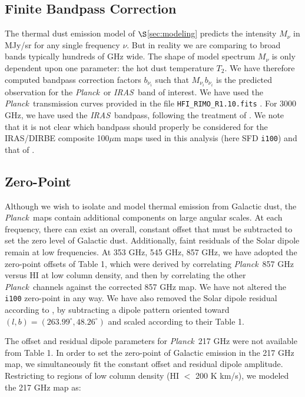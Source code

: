 \documentclass{emulateapj}
\newcommand{\IRAS}{{\it IRAS}}
\newcommand{\PLANCK}{{\it Planck}}
\begin{document}
\subsection{Finite Bandpass Correction}
The thermal dust emission model of $\S$\ref{sec:modeling} predicts the 
intensity $M_{\nu}$ in MJy/sr for any single frequency $\nu$. But in reality
we are comparing to broad bands typically hundreds of GHz wide. The shape of 
model spectrum $M_{\nu}$ is only dependent upon one parameter: the hot
dust temperature $T_2$. We have therefore computed bandpass correction factors
$b_{\nu_i}$ such that $M_{\nu_i}b_{\nu_i}$ is the predicted observation for the
\PLANCK~or \IRAS~band of interest. We have used the \PLANCK~transmission 
curves provided in the file \verb|HFI_RIMO_R1.10.fits| \citep{planckresponse}. 
For 3000 GHz, we have used the \IRAS~bandpass, following the treatment of
\cite{planckdust}. We note that it is not clear which bandpass should
properly be considered for the IRAS/DIRBE composite 100$\mu$m maps used in 
this analysis (here SFD \verb|i100|) and that of \cite{planckdust}.


\subsection{Zero-Point}
\label{sec:zp}
Although we wish to isolate and model thermal emission from Galactic dust, the
\PLANCK~maps contain additional components on large angular scales. At each 
frequency, there can exist an overall, constant offset that must be subtracted 
to set the zero level of Galactic dust. Additionally, faint residuals of the 
Solar dipole remain at low frequencies. At 353 GHz, 545 GHz, 857 GHz, we have 
adopted the zero-point offsets of \cite{planckdust} Table 1, which were derived
 by correlating \PLANCK~857 GHz versus HI at low column density, and then by 
correlating the other \PLANCK~channels against the corrected 857 GHz map. We 
have not altered the \verb|i100| zero-point in any way. We have also removed 
the Solar dipole residual according to \cite{planckdust}, by subtracting a 
dipole pattern oriented toward $(l, b) = (263.99^{\circ}, 48.26^{\circ})$ and 
scaled according to their Table 1.

The offset and residual dipole parameters for \PLANCK~217 GHz were not 
available from \cite{planckdust} Table 1. In order to set the zero-point of 
Galactic emission in the 217 GHz map, we simultaneously fit the constant 
offset and residual dipole amplitude. Restricting to regions of low column 
density (HI $<$ 200 K km/s), we modeled the 217 GHz map as:
\end{document}

